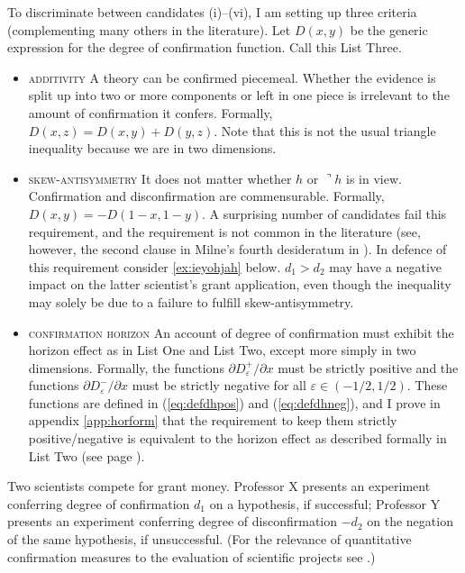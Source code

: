 \documentclass[phd,12pt,oneside]{ubcthesis}
\begin{document}
To discriminate between candidates (i)--(vi), I am setting up three
criteria (complementing many others in the literature). Let $D(x,y)$
be the generic expression for the degree of confirmation function.
Call this List Three\label{page:listthree}.

\begin{itemize}
\item \textsc{additivity} A theory can be confirmed piecemeal. Whether
  the evidence is split up into two or more components or left in one
  piece is irrelevant to the amount of confirmation it confers.
  Formally, $D(x,z)=D(x,y)+D(y,z)$. Note that this is not the usual
  triangle inequality because we are in two dimensions.
\item \textsc{skew-antisymmetry} It does not matter whether $h$ or
  $\urcorner{}h$ is in view. Confirmation and disconfirmation are
  commensurable. Formally, $D(x,y)=-D(1-x,1-y)$. A surprising number
  of candidates fail this requirement, and the requirement is not
  common in the literature (see, however, the second clause in Milne's
  fourth desideratum in ). In defence of this
  requirement consider {\xample} \ref{ex:ieyohjah} below.
  $d_{1}>{}d_{2}$ may have a negative impact on the latter scientist's
  grant application, even though the inequality may solely be due to a
  failure to fulfill skew-antisymmetry.
\item \textsc{confirmation horizon} An account of degree of
  confirmation must exhibit the horizon effect as in List One and List
  Two, except more simply in two dimensions. Formally, the functions
  $\partial{}D_{\varepsilon}^{+}/\partial{}x$ must be strictly
  positive and the functions
  $\partial{}D_{\varepsilon}^{-}/\partial{}x$ must be strictly
  negative for all $\varepsilon\in{}(-1/2,1/2)$. These functions are
  defined in (\ref{eq:defdhpos}) and (\ref{eq:defdhneg}), and I prove
  in appendix \ref{app:horform} that the requirement to keep them
  strictly positive/neg\-ative is equivalent to the horizon effect as
  described formally in List Two (see page \pageref{page:listtwo}).
\end{itemize}

\begin{quotex}
  \label{ex:ieyohjah} Two scientists
  compete for grant money. Professor X presents an experiment
  conferring degree of confirmation $d_{1}$ on a hypothesis, if
  successful; Professor Y presents an experiment conferring degree of
  disconfirmation $-d_{2}$ on the negation of the same hypothesis, if
  unsuccessful. (For the relevance of quantitative confirmation
  measures to the evaluation of scientific projects see
  .)
\end{quotex}
\end{document}
